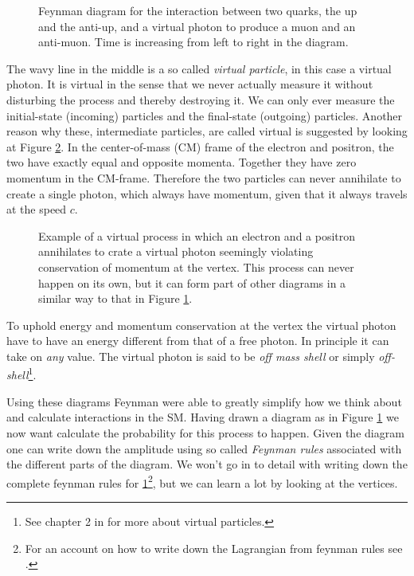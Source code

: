 \begin{figure}[htp]
\centering
	
\caption{Feynman diagram for the interaction between two quarks, the up and the anti-up, and a virtual photon to produce a muon and an anti-muon. Time is increasing from left to right in the diagram.} \label{fig:feyn:uu_a_mm}
\end{figure}

The wavy line in the middle is a so called \emph{virtual particle}, in this case a virtual photon. It is virtual in the sense that we never actually measure it without disturbing the process and thereby destroying it. We can only ever measure the initial-state (incoming) particles and the final-state (outgoing) particles. Another reason why these, intermediate particles, are called virtual is suggested by looking at Figure \ref{fig:feyn:ee_a}. In the center-of-mass (CM) frame of the electron and positron, the two have exactly equal and opposite momenta. Together they have zero momentum in the CM-frame. Therefore the two particles can never annihilate to create a single photon, which always have momentum, given that it always travels at the speed $c$.

\begin{figure}[htp]
\centering
	
\caption{Example of a virtual process in which an electron and a positron annihilates to crate a virtual photon seemingly violating conservation of momentum at the vertex. This process can never happen on its own, but it can form part of other diagrams in a similar way to that in Figure \ref{fig:feyn:uu_a_mm}.} \label{fig:feyn:ee_a}
\end{figure}

To uphold energy and momentum conservation at the vertex the virtual photon have to have an energy different from that of a free photon. In principle it can take on \emph{any} value. The virtual photon is said to be \emph{off mass shell} or simply \emph{off-shell}\footnote{See chapter 2 in \cite{griffiths1987iep} for more about virtual particles.}.

Using these diagrams Feynman were able to greatly simplify how we think about and calculate interactions in the SM. Having drawn a diagram as in Figure \ref{fig:feyn:uu_a_mm} we now want calculate the probability for this process to happen. Given the diagram one can write down the amplitude using so called \emph{Feynman rules} associated with the different parts of the diagram. We won't go in to detail with writing down the complete feynman rules for \ref{fig:feyn:uu_a_mm}\footnote{For an account on how to write down the Lagrangian from feynman rules see \cite{peskin1993iqf}.}, but we can learn a lot by looking at the vertices.

